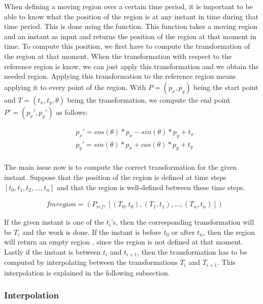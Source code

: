 		When defining a moving region over a certain time period, it is important to be able to know what the position of the region is at any instant in time during that time period. This is done using the  function. This function takes a moving region and an instant as input and returns the position of the region at that moment in time. To compute this position, we first have to compute the transformation of the region at that moment. When the transformation with respect to the reference region is know, we can just apply this transformation and we obtain the needed region. Applying this transformation to the reference region means applying it to every point of the region.
		With \( P = (p_x, p_y) \) being the start point and \( T = (t_x, t_y, \theta) \) being the transformation, we compute the end point \( P' = ({p_x}', {p_y}')  \) as follows:

		\begin{equation}
		\begin{split}
			& {p_x}' = cos(\theta)*p_x - sin(\theta)*p_y + t_x \\
			& {p_y}' = sin(\theta)*p_x + cos(\theta)*p_y + t_y \\
		\end{split}
		\end{equation}

		The main issue now is to compute the correct transformation for the given instant. Suppose that the position of the region is defined at time steps \( [t_0, t_1, t_2, ..., t_n] \) and that the region is well-defined between these time steps. 

		\begin{equation}
		\begin{split}
			& fmregion = (P_{ref}, [(T_0, t_0), (T_1, t_1), ..., (T_n, t_n)])
		\end{split}
		\end{equation}

		If the given instant is one of the \( t_i \)'s, then the corresponding transformation will be \( T_i \) and the work is done. If the instant is before \( t_0 \) or after \( t_n \), then the region will return an empty region , since the region is not defined at that moment. Lastly if the instant is between \( t_i \) and \( t_{i+1} \), then the transformation has to be computed by interpolating between the transformations \( T_i \) and \( T_{i+1} \). This interpolation is explained in the following subsection.

		\subsubsection{Interpolation}

